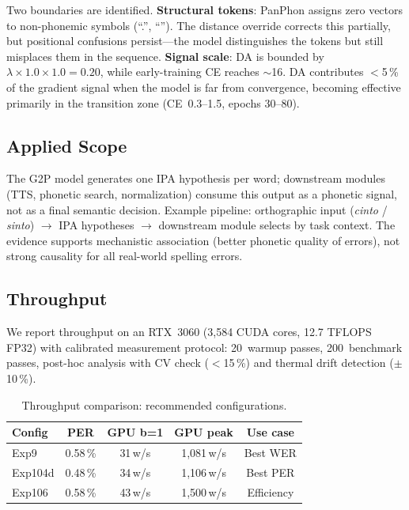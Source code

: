 \documentclass[conference]{IEEEtran}
\newcommand{\lam}{\lambda}                %
\begin{document}
Two boundaries are identified.
\textbf{Structural tokens}: PanPhon assigns zero vectors to
non-phonemic symbols (``.'', ``''). The distance
override corrects this partially, but positional confusions
persist---the model distinguishes the tokens but still misplaces
them in the sequence.
\textbf{Signal scale}: DA is bounded by
$\lam\!\times\!1.0\!\times\!1.0 = 0.20$, while early-training
CE reaches $\sim$16.
DA contributes $<$5\,\% of the gradient signal when the model is
far from convergence, becoming effective primarily in the
transition zone (CE~0.3--1.5, epochs 30--80).

\subsection{Applied Scope}

The G2P model generates one IPA hypothesis per word; downstream
modules (TTS, phonetic search, normalization) consume this output
as a phonetic signal, not as a final semantic decision.
Example pipeline: orthographic input (\textit{cinto} / \textit{sinto})
$\to$ IPA hypotheses $\to$ downstream module selects by task context.
The evidence supports mechanistic association (better phonetic quality
of errors), not strong causality for all real-world spelling errors.

\subsection{Throughput}

We report throughput on an RTX~3060 (3{,}584 CUDA cores, 12.7 TFLOPS
FP32) with calibrated measurement protocol: 20~warmup passes,
200~benchmark passes, post-hoc analysis with CV check ($<$15\,\%)
and thermal drift detection ($\pm$10\,\%).

\begin{table}[t]
  \caption{Throughput comparison: recommended configurations.}
  \label{tab:throughput}
  \centering\small
  \begin{tabular}{lcccc}
    \toprule
    Config & PER & GPU b=1 & GPU peak & Use case \\
    \midrule
    Exp9    & 0.58\,\% & 31\,w/s & 1{,}081\,w/s & Best WER \\
    Exp104d & 0.48\,\% & 34\,w/s & 1{,}106\,w/s & Best PER \\
    Exp106  & 0.58\,\% & 43\,w/s & 1{,}500\,w/s & Efficiency \\
    \bottomrule
  \end{tabular}
\end{table}
\end{document}
